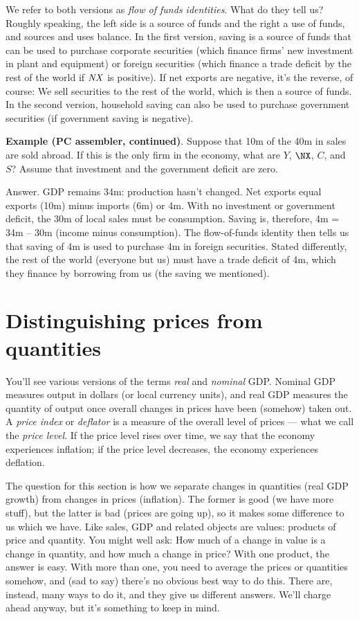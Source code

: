 We refer to both versions as {\it flow of funds identities\/}.
What do they tell us?
Roughly speaking, the left side is a source of funds and the right a use
of funds, and sources and uses balance.
In the first version, saving is a source of funds that can be used
to purchase corporate securities
(which finance firms' new investment in plant and equipment)
or foreign securities (which finance a trade deficit by the rest of the world
 if $ \mbox{\em NX\/} $ is positive).
If net exports are negative, it's the reverse, of course:
We sell securities to the rest of the world, which is then a source of funds.
In the second version, household saving can also be used to purchase government securities
(if government saving is negative).

\textbf{Example (PC assembler, continued)}.
Suppose that 10m of the 40m in sales are sold abroad.
If this is the only firm in the economy, what are $Y$, $\NX$, $C$, and $S$?
Assume that investment and the government deficit are zero.


Answer.  GDP remains 34m:  production hasn't changed.
Net exports equal exports (10m) minus imports (6m) or 4m.
With no investment or government deficit, the 30m of local sales must be consumption.
Saving is, therefore, 4m = 34m -- 30m (income minus consumption).
The flow-of-funds identity then tells us that saving of 4m is used to purchase 4m
in foreign securities. Stated differently, the rest of the world (everyone but us) must have a trade deficit
of 4m, which they finance by borrowing from us (the saving we mentioned).


\section{Distinguishing prices from quantities}


You'll see various versions of the terms {\it real\/} and {\it nominal\/} GDP.
Nominal GDP measures output in dollars (or local currency units),
and real GDP measures the quantity of output once overall changes in prices have been
(somehow) taken out.
A {\it price index\/} or {\it deflator\/} is a measure of the
overall level of prices --- what we call the {\it price level\/}.
If the price level rises over time, we say that the economy experiences
inflation; if the price level decreases, the economy experiences
deflation.

The question for this section is how we separate changes in quantities
(real GDP growth) from changes in prices (inflation).
The former is good (we have more stuff), but the latter is bad (prices are going up),
so it makes some difference to us which we have.
Like sales,
GDP and related objects are values: products of price and quantity.
You might well ask:  How much of a change in value is a change
in quantity, and how much a change in price?
With one product, the answer is easy.
With more than one, you need to average the prices or quantities somehow,
and (sad to say) there's no obvious best way to do this.
There are, instead, many ways to do it, and they give us
different answers.
We'll charge ahead anyway, but it's something to keep in mind.

